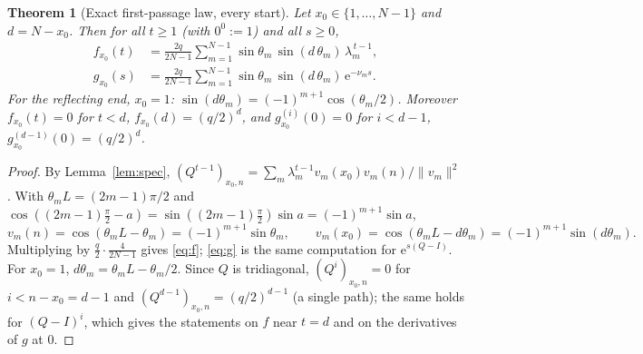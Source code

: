 \documentclass[11pt,a4paper]{article}
\newtheorem{theorem}{Theorem}[section]
\theoremstyle{definition}
\theoremstyle{remark}
\newcommand{\ee}{\mathrm{e}}
\begin{document}
\begin{theorem}[Exact first-passage law, every start]\label{thm:exact}
Let $x_0\in\{1,\dots,N-1\}$ and $d=N-x_0$. Then for all $t\ge1$ (with $0^0:=1$) and all $s\ge0$,
\begin{align}
 f_{x_0}(t)&=\frac{2q}{2N-1}\sum_{m=1}^{N-1}\sin\theta_m\,\sin(d\,\theta_m)\,\lambda_m^{\,t-1},\label{eq:f}\\
 g_{x_0}(s)&=\frac{2q}{2N-1}\sum_{m=1}^{N-1}\sin\theta_m\,\sin(d\,\theta_m)\,\ee^{-\nu_ms}.\label{eq:g}
\end{align}
For the reflecting end, $x_0=1$: $\sin(d\theta_m)=(-1)^{m+1}\cos(\theta_m/2)$. Moreover
$f_{x_0}(t)=0$ for $t<d$, $f_{x_0}(d)=(q/2)^d$, and $g_{x_0}^{(i)}(0)=0$ for $i<d-1$,
$g_{x_0}^{(d-1)}(0)=(q/2)^{d}$.
\end{theorem}
\begin{proof}
By Lemma~\ref{lem:spec}, $(Q^{t-1})_{x_0,n}=\sum_m\lambda_m^{t-1}v_m(x_0)v_m(n)/\|v_m\|^2$. With
$\theta_mL=(2m-1)\pi/2$ and $\cos((2m-1)\frac\pi2-a)=\sin((2m-1)\frac\pi2)\sin a=(-1)^{m+1}\sin a$,
\[
  v_m(n)=\cos(\theta_mL-\theta_m)=(-1)^{m+1}\sin\theta_m,\qquad
  v_m(x_0)=\cos(\theta_mL-d\theta_m)=(-1)^{m+1}\sin(d\theta_m).
\]
Multiplying by $\frac q2\cdot\frac4{2N-1}$ gives \eqref{eq:f}; \eqref{eq:g} is the same computation for
$\ee^{s(Q-I)}$. For $x_0=1$, $d\theta_m=\theta_mL-\theta_m/2$. Since $Q$ is tridiagonal,
$(Q^{i})_{x_0,n}=0$ for $i<n-x_0=d-1$ and $(Q^{d-1})_{x_0,n}=(q/2)^{d-1}$ (a single path); the same holds for
$(Q-I)^i$, which gives the statements on $f$ near $t=d$ and on the derivatives of $g$ at $0$.
\end{proof}
\end{document}
